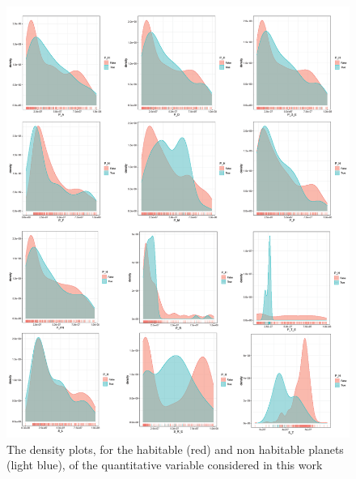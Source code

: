 \documentclass[
12pt, %
a4paper, %
oneside, %
headinclude,footinclude, %
BCOR5mm, %
]{scrartcl}
\begin{document}
\begin{figure}[h]
\begin{center}
\includegraphics[width=1\textwidth]{Pic/Merge.png}
\caption{The density plots, for the habitable (red) and non habitable planets (light blue), of the quantitative variable considered in this work}
\label{Desities}
\end{center}
\end{figure}
\end{document}
